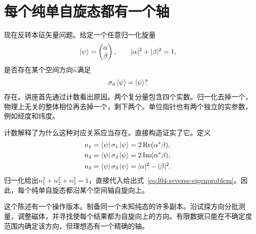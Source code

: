 \section{每个纯单自旋态都有一个轴}

现在反转本征矢量问题。给定一个任意归一化旋量
\begin{equation}
  \left\lvert\psi\right\rangle=
  \begin{pmatrix}\alpha\\\beta\end{pmatrix},
  \qquad
  |\alpha|^2+|\beta|^2=1,
  \label{eq:l04-general-spinor}
\end{equation}
是否存在某个空间方向\(\hat n\)满足
\begin{equation}
  \sigma_{\hat n}\left\lvert\psi\right\rangle=\left\lvert\psi\right\rangle?
  \label{eq:l04-reverse-eigenproblem}
\end{equation}
存在。讲座首先通过计数看出原因。两个复分量包含四个实数。归一化去掉一个，物理上无关的整体相位再去掉一个，剩下两个。单位指针也有两个独立的实参数，例如经度和纬度。

\begin{classroomqa}
\end{classroomqa}

\begin{classroomqa}
\end{classroomqa}

计数解释了为什么这种对应关系应当存在。直接构造证实了它。定义
\begin{align}
  n_1&=\left\langle\psi\right\rvert\sigma_1\left\lvert\psi\right\rangle
      =2\operatorname{Re}(\alpha^*\beta),
  \notag\\
  n_2&=\left\langle\psi\right\rvert\sigma_2\left\lvert\psi\right\rangle
      =2\operatorname{Im}(\alpha^*\beta),
  \notag\\
  n_3&=\left\langle\psi\right\rvert\sigma_3\left\lvert\psi\right\rangle
      =|\alpha|^2-|\beta|^2.
  \label{eq:l04-bloch-components}
\end{align}
归一化给出\(n_1^2+n_2^2+n_3^2=1\)，直接代入给出式~\eqref{eq:l04-reverse-eigenproblem}。因此，每个纯单自旋态都沿某个空间轴自旋向上。

这个陈述有一个操作版本。制备同一个未知纯态的许多副本。沿试探方向分批测量，调整磁体，并寻找使每个结果都为自旋向上的方向。有限数据只能在不确定度范围内确定该方向，但理想态有一个精确的轴。

